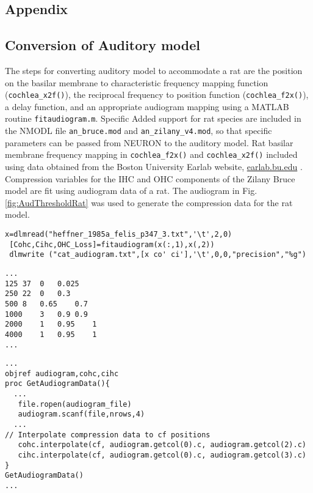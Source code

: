 \graphicspath{{/media/data/Work/cnstellate/golgi/}{/media/data/Work/cnstellate/Responses/}{../figures/}{./gfx/}}

\begin{appendix}
\section{Appendix}
\label{sec:chp3appendix}
\subsection{Conversion of Auditory model}


The steps for converting \citet{ZilanyBruce:2007} auditory model to
accommodate a rat are the position on the basilar membrane to
characteristic frequency mapping function (\texttt{cochlea\_x2f()}), the
reciprocal frequency to position function (\texttt{cochlea\_f2x()}), a
delay function, and an appropriate audiogram mapping using a MATLAB
routine \texttt{fitaudiogram.m}.  Specific Added support for rat species
are included in the NMODL file \texttt{an\_bruce.mod} and \texttt{an\_zilany\_v4.mod}, so that specific
parameters can be passed from NEURON to the auditory model.  Rat
basilar membrane frequency mapping in \texttt{cochlea\_f2x()} and
\texttt{cochlea\_x2f()} included using data obtained from the Boston University Earlab
website, \url{earlab.bu.edu} .  Compression variables for the IHC and OHC
components of the Zilany Bruce model are fit using audiogram data of a
rat.  The audiogram in Fig. \ref{fig:AudThresholdRat} was used to
generate the compression data for the rat model.

\medskip{}

\begin{lstlisting}[label=lst:makeaudiogram,caption=Using fitaudiogram.m to create COHC and CIHC vectors for the cat.]
 x=dlmread("heffner_1985a_felis_p347_3.txt",'\t',2,0)
 [Cohc,Cihc,OHC_Loss]=fitaudiogram(x(:,1),x(,2))
 dlmwrite ("cat_audiogram.txt",[x co' ci'],'\t',0,0,"precision","%g")
\end{lstlisting}


\begin{lstlisting}[label=lst:cataudiogram,caption=Portion of cat\_audiogram.txt]
...
125	37	0	0.025
250	22	0	0.3
500	8	0.65	0.7
1000	3	0.9	0.9
2000	1	0.95	1
4000	1	0.95	1
...
\end{lstlisting}


\begin{lstlisting}[label=lst:getaudiogramdata,caption= Procedure to get audiogram data and interpolate to freuencies in \texttt{cf} vector (Utilities.hoc)]
...
objref audiogram,cohc,cihc
proc GetAudiogramData(){
  ...
   file.ropen(audiogram_file)
   audiogram.scanf(file,nrows,4)
  ...
// Interpolate compression data to cf positions
   cohc.interpolate(cf, audiogram.getcol(0).c, audiogram.getcol(2).c)
   cihc.interpolate(cf, audiogram.getcol(0).c, audiogram.getcol(3).c)
}
GetAudiogramData() 
...
\end{lstlisting}


\end{appendix}
